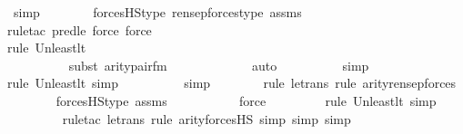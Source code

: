 \begin{isabellebody}
\ simp\isanewline
\ \ \ \ \ \ \isamarkupfalse%
\ forcesHS{\isacharunderscore}{\kern0pt}type\ ren{\isacharunderscore}{\kern0pt}sep{\isacharunderscore}{\kern0pt}forces{\isacharunderscore}{\kern0pt}type\ assms\ \isanewline
\ \ \ \ \ \ \ \isamarkupfalse%
{\isacharparenleft}{\kern0pt}rule{\isacharunderscore}{\kern0pt}tac\ pred{\isacharunderscore}{\kern0pt}le{\isacharcomma}{\kern0pt}\ force{\isacharcomma}{\kern0pt}\ force{\isacharparenright}{\kern0pt}{\isacharplus}{\kern0pt}\isanewline
\ \ \ \ \ \ \ \isamarkupfalse%
{\isacharparenleft}{\kern0pt}rule\ Un{\isacharunderscore}{\kern0pt}least{\isacharunderscore}{\kern0pt}lt{\isacharparenright}{\kern0pt}\ \ \ \ \ \ \ \ \ \ \ \ \ \ \ \ \ \ \ \ \ \ \ \ \ \ \ \ \ \ \ \ \ \ \ \ \ \ \ \ \ \ \ \ \ \ \ \ \ \ \ \ \ \ \ \ \ \ \isanewline
\ \ \ \ \ \ \ \ \isamarkupfalse%
\ {\isacharparenleft}{\kern0pt}subst\ arity{\isacharunderscore}{\kern0pt}pair{\isacharunderscore}{\kern0pt}fm{\isacharparenright}{\kern0pt}\isanewline
\ \ \ \ \ \ \ \ \ \ \ \isamarkupfalse%
\ auto{\isacharbrackleft}{\kern0pt}{}{\isacharbrackright}{\kern0pt}\isanewline
\ \ \ \ \ \ \ \ \isamarkupfalse%
\ simp\isanewline
\ \ \ \ \ \ \ \ \isamarkupfalse%
{\isacharparenleft}{\kern0pt}rule\ Un{\isacharunderscore}{\kern0pt}least{\isacharunderscore}{\kern0pt}lt{\isacharcomma}{\kern0pt}\ simp{\isacharparenright}{\kern0pt}{\isacharplus}{\kern0pt}\isanewline
\ \ \ \ \ \ \ \ \isamarkupfalse%
\ simp\isanewline
\ \ \ \ \ \ \ \isamarkupfalse%
{\isacharparenleft}{\kern0pt}rule\ le{\isacharunderscore}{\kern0pt}trans{\isacharcomma}{\kern0pt}\ rule\ arity{\isacharunderscore}{\kern0pt}ren{\isacharunderscore}{\kern0pt}sep{\isacharunderscore}{\kern0pt}forces{\isacharparenright}{\kern0pt}\isanewline
\ \ \ \ \ \ \isamarkupfalse%
\ forcesHS{\isacharunderscore}{\kern0pt}type\ assms\ \isanewline
\ \ \ \ \ \ \ \ \isamarkupfalse%
\ force\ \isanewline
\ \ \ \ \ \ \ \isamarkupfalse%
{\isacharparenleft}{\kern0pt}rule\ Un{\isacharunderscore}{\kern0pt}least{\isacharunderscore}{\kern0pt}lt{\isacharcomma}{\kern0pt}\ simp{\isacharparenright}{\kern0pt}\isanewline
\ \ \ \ \ \ \ \ \isamarkupfalse%
{\isacharparenleft}{\kern0pt}rule{\isacharunderscore}{\kern0pt}tac\ le{\isacharunderscore}{\kern0pt}trans{\isacharcomma}{\kern0pt}\ rule\ arity{\isacharunderscore}{\kern0pt}forcesHS{\isacharcomma}{\kern0pt}\ simp{\isacharcomma}{\kern0pt}\ simp{\isacharcomma}{\kern0pt}\ simp{\isacharparenright}{\kern0pt}\isanewline

\end{isabellebody}
